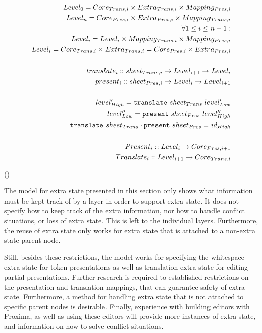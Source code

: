 \begin{small}\begin{align*}%
Level_{0} = Core_{Trans,i} \times Extra_{Trans,i} \times Mapping_{Pres,i}\\
Level_{n} = Core_{Pres,i} \times Extra_{Pres,i} \times Mapping_{Trans,i}\\
\forall 1 \le i \le n-1:  \\
Level_{i} = Level_{i} \times Mapping_{Trans,i} \times Mapping_{Pres,i}\\
Level_{i} = Core_{Trans,i} \times Extra_{Trans,i} = Core_{Pres,i} \times Extra_{Pres,i} \\
\\
translate_{i} :: sheet_{Trans,i} \rightarrow Level_{i+1} \rightarrow Level_{i}\\
present_{i} :: sheet_{Pres,i}  \rightarrow  Level_{i} \rightarrow Level_{i+1}\\
\\
level'_{High} = {\tt translate}~sheet_{Trans}~level'_{Low}\\
level''_{Low} = {\tt present}~sheet_{Pres}~level''_{High}\\
{\tt translate}~sheet_{Trans}  \cdot {\tt present}~sheet_{Pres} = id_{High}\\
\\
Present_{i} :: Level_{i} \rightarrow Core_{Pres,i+1}\\
Translate_{i} :: Level_{i+1} \rightarrow Core_{Trans,i}\\
\end{align*} 
\end{small}
{\centering ()\\}

The model for extra state presented in this section only shows what information must be kept track of by a layer in order to support extra state. It does not specify how to keep track of the extra information, nor how to handle conflict situations, or loss of extra state. This is left to the individual layers. Furthermore, the reuse of extra state only works for extra state that is attached to a non-extra state parent node. 

Still, besides these restrictions, the model works for specifying the whitespace extra state for token presentations as well as translation extra state for editing partial presentations. Further research is required to established restrictions on the presentation and translation mappings, that can guarantee safety of extra state. Furthermore, a method for handling extra state that is not attached to specific parent nodes is desirable. Finally, experience with building editors with Proxima, as well as using these editors will provide more instances of extra state, and information on how to solve conflict situations.

